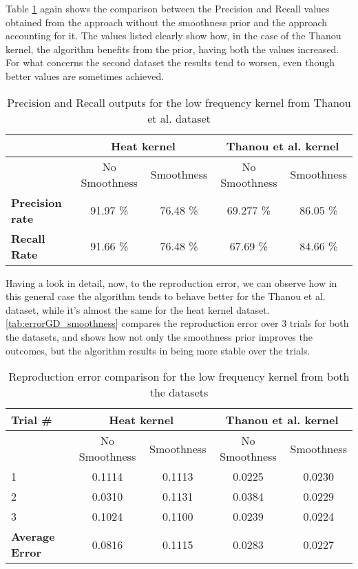 Table \ref{tab:PrecRec_compSmth} again shows the comparison between the Precision and Recall values obtained from the approach without the smoothness prior and the approach accounting for it. The values listed clearly show how, in the case of the Thanou kernel, the algorithm benefits from the prior, having both the values increased. For what concerns the second dataset the results tend to worsen, even though better values are sometimes achieved.

\begin{table}[htbp]
  \centering
  \begin{tabular}{lcccc}
  &\multicolumn{2}{c}{\textbf{Heat kernel}}&\multicolumn{2}{c}{\textbf{Thanou et al. kernel}}\\
  \toprule
  &No Smoothness & Smoothness & No Smoothness & Smoothness\\ %
    \midrule
    \textbf{Precision rate} & 91.97 \% & 76.48 \% & 69.277 \% & 86.05 \%\\
    \textbf{Recall Rate} & 91.66 \% & 76.48 \% & 67.69 \% & 84.66 \%\\
    \bottomrule
  \end{tabular}
  \caption{Precision and Recall outputs for the low frequency kernel from Thanou et al. dataset}
  \label{tab:PrecRec_compSmth}
\end{table}

Having a look in detail, now, to the reproduction error, we can observe how in this general case the algorithm tends to behave better for the Thanou et al. dataset, while it's almost the same for the heat kernel dataset. \autoref{tab:errorGD_smoothness} compares the reproduction error over $3$ trials for both the datasets, and shows how not only the smoothness prior improves the outcomes, but the algorithm results in being more stable over the trials.

\begin{table}[htbp]
  \centering
  \begin{tabular}{lcccc}
  \textbf{Trial \#} &\multicolumn{2}{c}{\textbf{Heat kernel}}&\multicolumn{2}{c}{\textbf{Thanou et al. kernel}}\\
  \toprule
  & No Smoothness & Smoothness & No Smoothness & Smoothness\\ %
  \midrule
    1 & 0.1114 & 0.1113 & 0.0225 & 0.0230\\
    2 & 0.0310 & 0.1131 & 0.0384 & 0.0229\\
    3 & 0.1024 & 0.1100 & 0.0239 & 0.0224\\
    \textbf{Average Error} & 0.0816 & 0.1115 & 0.0283 & 0.0227 \\
    \bottomrule
  \end{tabular}
  \caption{Reproduction error comparison for the low frequency kernel from both the datasets}
  \label{tab:errorGD_smoothness}
\end{table}

